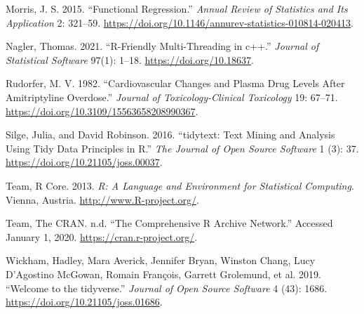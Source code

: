 \begin{CSLReferences}{1}{0}
\leavevmode{}%
Morris, J. S. 2015. {``Functional Regression.''} \emph{Annual Review of Statistics and Its Application} 2: 321--59. \url{https://doi.org/10.1146/annurev-statistics-010814-020413}.

\leavevmode{}%
Nagler, Thomas. 2021. {``R-Friendly Multi-Threading in c++.''} \emph{Journal of Statistical Software} 97(1): 1--18. \url{https://doi.org/10.18637}.

\leavevmode{}%
Rudorfer, M. V. 1982. {``Cardiovascular Changes and Plasma Drug Levels After Amitriptyline Overdose.''} \emph{Journal of Toxicology-Clinical Toxicology} 19: 67--71. \url{https://doi.org/10.3109/15563658208990367}.

\leavevmode{}%
Silge, Julia, and David Robinson. 2016. {``{tidytext: Text Mining and Analysis Using Tidy Data Principles in R}.''} \emph{The Journal of Open Source Software} 1 (3): 37. \url{https://doi.org/10.21105/joss.00037}.

\leavevmode{}%
Team, R Core. 2013. \emph{{R: A Language and Environment for Statistical Computing}}. Vienna, Austria. \url{http://www.R-project.org/}.

\leavevmode{}%
Team, The CRAN. n.d. {``{The Comprehensive R Archive Network}.''} Accessed January 1, 2020. \url{https://cran.r-project.org/}.

\leavevmode{}%
Wickham, Hadley, Mara Averick, Jennifer Bryan, Winston Chang, Lucy D'Agostino McGowan, Romain François, Garrett Grolemund, et al. 2019. {``{Welcome to the tidyverse}.''} \emph{Journal of Open Source Software} 4 (43): 1686. \url{https://doi.org/10.21105/joss.01686}.

\end{CSLReferences}



\address{%
Tommy Jones\\
Foundation\\%
\\
%
%
%
%
}

\address{%
Mark J. Meyer\\
Georgetown University\\%
\\
%
%
%
%
}
